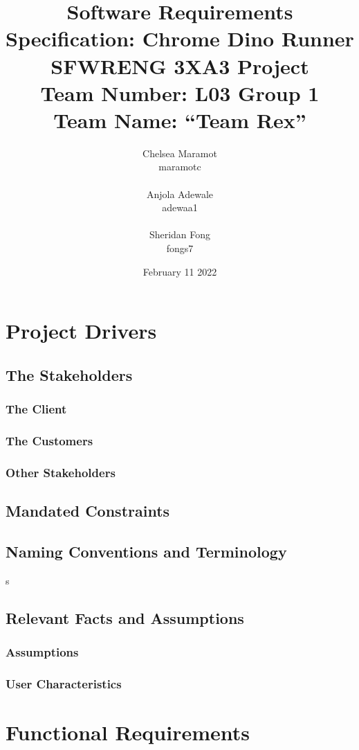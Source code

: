 \documentclass{article}
\title{Software Requirements Specification: Chrome Dino Runner \\ \bigskip \large SFWRENG 3XA3 Project \\ \bigskip \large Team Number: L03 Group 1 \\ \large Team Name: ``Team Rex'' }
\author{Chelsea Maramot \\ maramotc \\ \\ Anjola Adewale \\ adewaa1 \\ \\ Sheridan Fong \\ fongs7 }
\date{February 11 2022}
\begin{document}
\maketitle

\section{Project Drivers}
\subsection{The Stakeholders}
\subsubsection{The Client}
\subsubsection{The Customers}
\subsubsection{Other Stakeholders}

\subsection{Mandated Constraints}
\subsection{Naming Conventions and Terminology}s

\subsection{Relevant Facts and Assumptions}

\subsubsection{Assumptions}

\subsubsection{User Characteristics}



\section{Functional Requirements}
\end{document}
